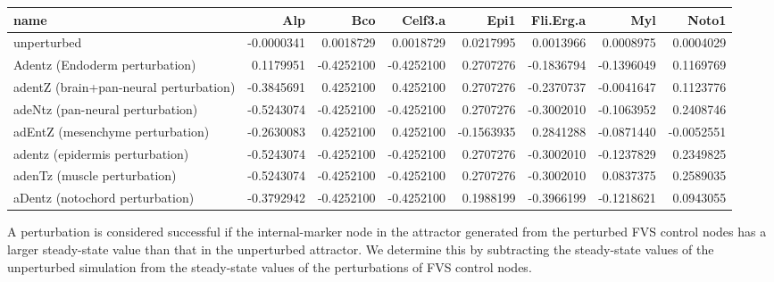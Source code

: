 \documentclass[
]{book}
\begin{document}
\begin{table}
\centering\begingroup\fontsize{8}{10}\selectfont

\begin{tabular}{l|r|r|r|r|r|r|r}
\hline
name & Alp & Bco & Celf3.a & Epi1 & Fli.Erg.a & Myl & Noto1\\
\hline
unperturbed & -0.0000341 & 0.0018729 & 0.0018729 & 0.0217995 & 0.0013966 & 0.0008975 & 0.0004029\\
\hline
Adentz (Endoderm perturbation) & 0.1179951 & -0.4252100 & -0.4252100 & 0.2707276 & -0.1836794 & -0.1396049 & 0.1169769\\
\hline
adentZ (brain+pan-neural perturbation) & -0.3845691 & 0.4252100 & 0.4252100 & 0.2707276 & -0.2370737 & -0.0041647 & 0.1123776\\
\hline
adeNtz (pan-neural perturbation) & -0.5243074 & -0.4252100 & -0.4252100 & 0.2707276 & -0.3002010 & -0.1063952 & 0.2408746\\
\hline
adEntZ (mesenchyme perturbation) & -0.2630083 & 0.4252100 & 0.4252100 & -0.1563935 & 0.2841288 & -0.0871440 & -0.0052551\\
\hline
adentz (epidermis perturbation) & -0.5243074 & -0.4252100 & -0.4252100 & 0.2707276 & -0.3002010 & -0.1237829 & 0.2349825\\
\hline
adenTz (muscle perturbation) & -0.5243074 & -0.4252100 & -0.4252100 & 0.2707276 & -0.3002010 & 0.0837375 & 0.2589035\\
\hline
aDentz (notochord perturbation) & -0.3792942 & -0.4252100 & -0.4252100 & 0.1988199 & -0.3966199 & -0.1218621 & 0.0943055\\
\hline
\end{tabular}
\endgroup{}
\end{table}

A perturbation is considered successful if the internal-marker node in the attractor generated from the perturbed FVS control nodes has a larger steady-state value than that in the unperturbed attractor. We determine this by subtracting the steady-state values of the unperturbed simulation from the steady-state values of the perturbations of FVS control nodes.
\end{document}
